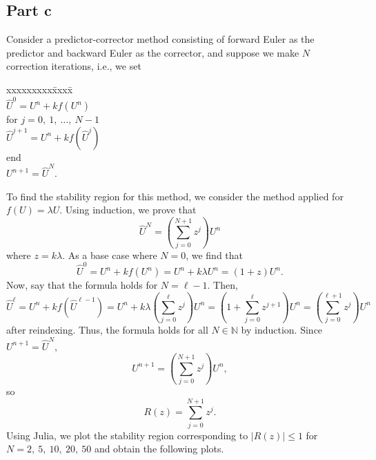 \documentclass{article}
\begin{document}
\subsection{Part c}
Consider a predictor-corrector method consisting
of forward Euler as the predictor and backward Euler as the corrector, and
suppose we make $N$ correction iterations, i.e., we set
\begin{tabbing}
	xxxxxxxxx\=xxxx\=\kill\\
	\>$\hat U^0 = U^n + kf(U^n)$\\
	\>for $j = 0,~1,~\ldots,~N-1$\\
	\>\>$\hat U^{j+1} = U^n + kf(\hat U^j)$\\
	\>\>end\\
	\>$U^{n+1} = \hat U^N$.\\
\end{tabbing}
To find the stability region for this method, we consider the method applied for $f(U)=\lambda U$. Using induction, we prove that 
\[
\hat{U}^N=\left(\sum_{j=0}^{N+1}z^j\right)U^n
\]
where $z=k\lambda$. As a base case where $N=0$, we find that 
\[
\hat{U}^0=U^n+kf(U^n)=U^n+k\lambda U^n=(1+z)U^n.
\]
Now, say that the formula holds for $N=\ell-1$. Then,
\[
\hat{U}^\ell=U^n+kf(\hat{U}^{\ell-1})=U^n+k\lambda\left(\sum_{j=0}^{\ell}z^j\right)U^n=\left(1+\sum_{j=0}^{\ell}z^{j+1}\right)U^n=\left(\sum_{j=0}^{\ell+1}z^j\right)U^n
\]
after reindexing. Thus, the formula holds for all $N\in\mathbb{N}$ by induction. Since $U^{n+1}=\hat{U}^N$, 
\[
U^{n+1}=\left(\sum_{j=0}^{N+1}z^j\right)U^n,
\]
so
\[
R(z)=\sum_{j=0}^{N+1}z^j.
\]
Using Julia, we plot the stability region corresponding to $|R(z)|\leq1$ for $N=2,~5,~10,~20,~50$ and obtain the following plots. \\
\end{document}
